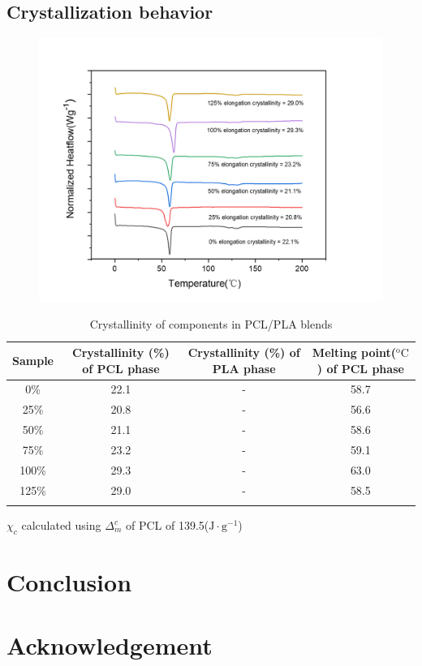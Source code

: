 \documentclass{Head}
\begin{document}
    \subsection{Crystallization behavior}
    \begin{figure} %
      \includegraphics[scale = 0.5]{figures/DSC_result_1.png}
    \end{figure}
    \label{sec:result_and_Analysis}
    \renewcommand{\tablename}{\textbf{Table}}
    \captionsetup[table]{labelsep = period}
    \begin{table} %
      \caption{Crystallinity of components in PCL/PLA blends}
      \begin{tabular}{cccc}
      \toprule
      Sample & Crystallinity (\%) of PCL phase & Crystallinity (\%) of PLA phase & Melting point($\mathrm{^o C}$) of PCL phase\\
      \midrule
      0\% & 22.1 & - & 58.7\\
      25\% & 20.8 & - & 56.6\\
      50\% & 21.1 & - & 58.6\\
      75\% & 23.2 & - & 59.1\\
      100\% & 29.3 & - & 63.0 \\
      125\% & 29.0 & - & 58.5 \\
      \bottomrule
      \label{DSC_result_table}
      \end{tabular}
      $\chi_c $ calculated using $\Delta_m^c$ of PCL of 139.5($\mathrm{J\cdot g^{-1}}$)
    \end{table}
  \section{Conclusion} %
  \label{sec:conclusion}
  
  \section{Acknowledgement} %
  \label{sec:acknowledgement}
  
  
  
\end{document}
